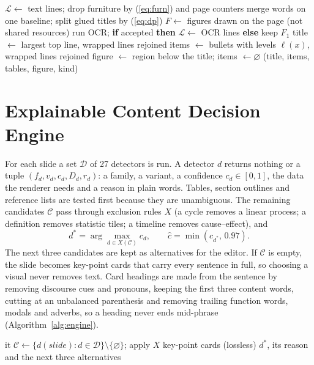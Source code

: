 \documentclass[conference]{IEEEtran}
\begin{document}
\begin{algorithm}[H]
\caption{Reading one page of a slide PDF}
\label{alg:reader}
\begin{algorithmic}[1]
\State $\mathcal{L}\gets$ text lines; drop furniture by (\ref{eq:furn}) and page counters
\State merge words on one baseline; split glued titles by (\ref{eq:dp})
\State $F\gets$ figures drawn on the page (not shared resources)
  \State run OCR; \textbf{if} accepted \textbf{then} $\mathcal{L}\gets$ OCR lines \textbf{else} keep $F_1$
\EndIf
\State title $\gets$ largest top line, wrapped lines rejoined
\State items $\gets$ bullets with levels $\ell(x)$, wrapped lines rejoined
 \State figure $\gets$ region below the title; items $\gets\varnothing$ \EndIf
\State \Return (title, items, tables, figure, kind)
\end{algorithmic}
\end{algorithm}

\section{Explainable Content Decision Engine}
\label{sec:engine}
For each slide a set $\mathcal{D}$ of 27 detectors is run. A detector $d$ returns nothing or a tuple
$(f_d,v_d,c_d,D_d,r_d)$: a family, a variant, a confidence $c_d\in[0,1]$, the data the renderer needs and a reason in plain
words. Tables, section outlines and reference lists are tested first because they are unambiguous. The remaining
candidates $\mathcal{C}$ pass through exclusion rules $X$ (a cycle removes a linear process; a definition removes statistic
tiles; a timeline removes cause--effect), and
\begin{equation}
d^{*}=\arg\max_{d\in X(\mathcal{C})}c_d,\qquad \hat c=\min(c_{d^{*}},\,0.97).
\end{equation}
The next three candidates are kept as alternatives for the editor. If $\mathcal{C}$ is empty, the slide becomes key-point
cards that carry every sentence in full, so choosing a visual never removes text. Card headings are made from the sentence
by removing discourse cues and pronouns, keeping the first three content words, cutting at an unbalanced parenthesis and
removing trailing function words, modals and adverbs, so a heading never ends mid-phrase (Algorithm~\ref{alg:engine}).

\begin{algorithm}[H]
\caption{Visual decision for one slide}
\label{alg:engine}
\begin{algorithmic}[1]
 \State \Return it \EndIf
\State $\mathcal{C}\gets\{d(\mathit{slide}) : d\in\mathcal{D}\}\setminus\{\varnothing\}$; apply $X$
 \State \Return key-point cards (lossless) \EndIf
\State \Return $d^{*}$, its reason and the next three alternatives
\end{algorithmic}
\end{algorithm}
\end{document}
